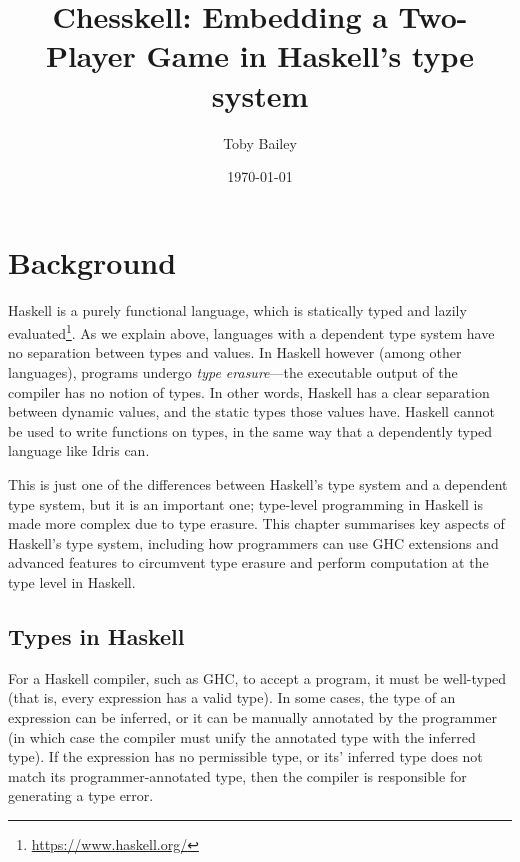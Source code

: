 \documentclass[12pt, a4paper, bibliography=totocnumbered]{scrreprt}
\title{Chesskell: Embedding a Two-Player Game in Haskell's type system}
\author{Toby Bailey}
\date{\today}
\begin{document}
\begin{titlepage}
    \maketitle
\end{titlepage}



{
    \newpage  %
    \renewcommand{\normalfont}{\usekomafont{sectioning}}
}





\chapter{Background}

Haskell is a purely functional language, which is statically typed and lazily evaluated\footnote{\url{https://www.haskell.org/}}. As we explain above, languages with a dependent type system have no separation between types and values. In Haskell however (among other languages), programs undergo \emph{type erasure}---the executable output of the compiler has no notion of types. In other words, Haskell has a clear separation between dynamic values, and the static types those values have. Haskell cannot be used to write functions on types, in the same way that a dependently typed language like Idris can.

This is just one of the differences between Haskell's type system and a dependent type system, but it is an important one; type-level programming in Haskell is made more complex due to type erasure. This chapter summarises key aspects of Haskell's type system, including how programmers can use GHC extensions and advanced features to circumvent type erasure and perform computation at the type level in Haskell.

\section{Types in Haskell}

For a Haskell compiler, such as GHC, to accept a program, it must be well-typed (that is, every expression has a valid type). In some cases, the type of an expression can be inferred, or it can be manually annotated by the programmer (in which case the compiler must unify the annotated type with the inferred type). If the expression has no permissible type, or its' inferred type does not match its programmer-annotated type, then the compiler is responsible for generating a type error.
\end{document}
